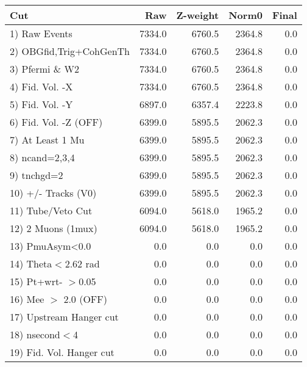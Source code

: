  \begin{table}[h!]\centering
 \begin{tabular}{||l||r|r|r|r||}
 \hline
 \hline
 Cut & Raw & Z-weight & Norm0 & Final \\
 \hline
  1) Raw Events           &      7334.0 &      6760.5 &      2364.8 &         0.0 \\
  2) OBGfid,Trig+CohGenTh &      7334.0 &      6760.5 &      2364.8 &         0.0 \\
  3) Pfermi \& W2         &      7334.0 &      6760.5 &      2364.8 &         0.0 \\
  4) Fid. Vol. -X         &      7334.0 &      6760.5 &      2364.8 &         0.0 \\
  5) Fid. Vol. -Y         &      6897.0 &      6357.4 &      2223.8 &         0.0 \\
  6) Fid. Vol. -Z (OFF)   &      6399.0 &      5895.5 &      2062.3 &         0.0 \\
  7) At Least 1 Mu        &      6399.0 &      5895.5 &      2062.3 &         0.0 \\
  8) ncand=2,3,4          &      6399.0 &      5895.5 &      2062.3 &         0.0 \\
  9) tnchgd=2             &      6399.0 &      5895.5 &      2062.3 &         0.0 \\
 10) +/- Tracks (V0)      &      6399.0 &      5895.5 &      2062.3 &         0.0 \\
 11) Tube/Veto Cut        &      6094.0 &      5618.0 &      1965.2 &         0.0 \\
 12) 2 Muons (1mux)       &      6094.0 &      5618.0 &      1965.2 &         0.0 \\
 13) PmuAsym<0.0          &         0.0 &         0.0 &         0.0 &         0.0 \\
 14) Theta$<$2.62 rad     &         0.0 &         0.0 &         0.0 &         0.0 \\
 15) Pt+wrt- $>$0.05      &         0.0 &         0.0 &         0.0 &         0.0 \\
 16) Mee $>$ 2.0  (OFF)   &         0.0 &         0.0 &         0.0 &         0.0 \\
 17) Upstream Hanger cut  &         0.0 &         0.0 &         0.0 &         0.0 \\
 18) nsecond$<$4          &         0.0 &         0.0 &         0.0 &         0.0 \\
 19) Fid. Vol. Hanger cut &         0.0 &         0.0 &         0.0 &         0.0 \\

\end{tabular}
\end{table}

